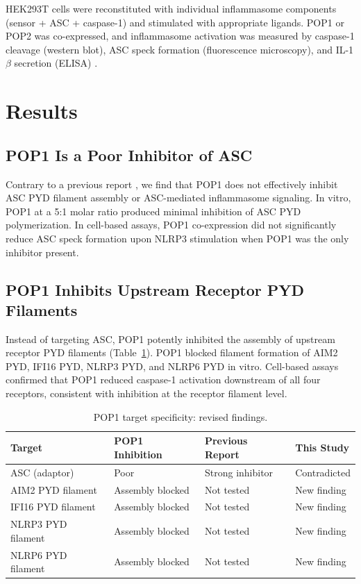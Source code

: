\documentclass[11pt]{article}
\begin{document}
HEK293T cells were reconstituted with individual inflammasome components (sensor + ASC + caspase-1) and stimulated with appropriate ligands. POP1 or POP2 was co-expressed, and inflammasome activation was measured by caspase-1 cleavage (western blot), ASC speck formation (fluorescence microscopy), and IL-1$\beta$ secretion (ELISA) \citep{stutz2013}.

\section{Results}

\subsection{POP1 Is a Poor Inhibitor of ASC}

Contrary to a previous report \citep{stehlik2003}, we find that POP1 does not effectively inhibit ASC PYD filament assembly or ASC-mediated inflammasome signaling. In vitro, POP1 at a 5:1 molar ratio produced minimal inhibition of ASC PYD polymerization. In cell-based assays, POP1 co-expression did not significantly reduce ASC speck formation upon NLRP3 stimulation when POP1 was the only inhibitor present.

\subsection{POP1 Inhibits Upstream Receptor PYD Filaments}

Instead of targeting ASC, POP1 potently inhibited the assembly of upstream receptor PYD filaments (Table~\ref{tab:pop1}). POP1 blocked filament formation of AIM2 PYD, IFI16 PYD, NLRP3 PYD, and NLRP6 PYD in vitro. Cell-based assays confirmed that POP1 reduced caspase-1 activation downstream of all four receptors, consistent with inhibition at the receptor filament level.

\begin{table}[ht]
\centering
\caption{POP1 target specificity: revised findings.}
\label{tab:pop1}
\begin{tabular}{llll}
\toprule
\textbf{Target} & \textbf{POP1 Inhibition} & \textbf{Previous Report} & \textbf{This Study} \\
\midrule
ASC (adaptor) & Poor & Strong inhibitor & Contradicted \\
AIM2 PYD filament & Assembly blocked & Not tested & New finding \\
IFI16 PYD filament & Assembly blocked & Not tested & New finding \\
NLRP3 PYD filament & Assembly blocked & Not tested & New finding \\
NLRP6 PYD filament & Assembly blocked & Not tested & New finding \\
\bottomrule
\end{tabular}
\end{table}
\end{document}
